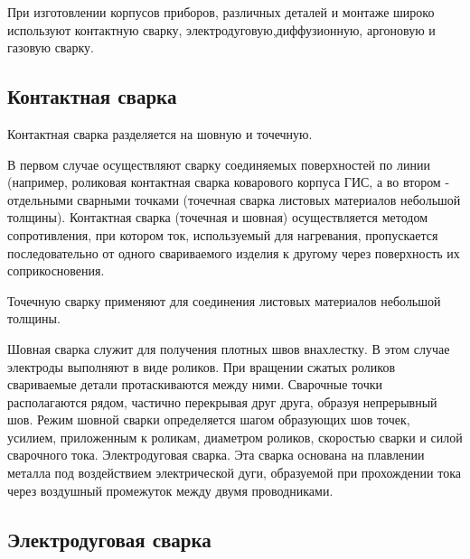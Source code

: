 \documentclass[unicode, 12pt, a4paper, oneside]{article}
\begin{document}
При изготовлении корпусов приборов, различных деталей и монтаже широко используют контактную сварку, электродуговую,диффузионную, аргоновую и газовую сварку.

\subsection*{Контактная сварка}

Контактная сварка разделяется на шовную и точечную. 

В первом случае осуществляют сварку соединяемых поверхностей по линии (например, роликовая контактная сварка коварового корпуса ГИС, а во втором - отдельными сварными точками (точечная сварка листовых материалов небольшой толщины). Контактная сварка (точечная и шовная) осуществляется методом сопротивления, при котором ток, используемый для нагревания, пропускается последовательно от одного свариваемого изделия к другому через поверхность их соприкосновения.

Точечную сварку применяют для соединения листовых материалов небольшой толщины.

Шовная сварка служит для получения плотных швов внахлестку. В этом случае электроды выполняют в виде роликов. При вращении сжатых роликов свариваемые детали протаскиваются между ними. Сварочные точки располагаются рядом, частично перекрывая друг друга, образуя непрерывный шов. Режим шовной сварки определяется шагом образующих шов точек, усилием, приложенным к роликам, диаметром роликов, скоростью сварки и силой сварочного тока. Электродуговая сварка. Эта сварка основана на плавлении металла под воздействием электрической дуги, образуемой при прохождении тока через воздушный промежуток между двумя проводниками.

\subsection*{Электродуговая сварка}
\end{document}
